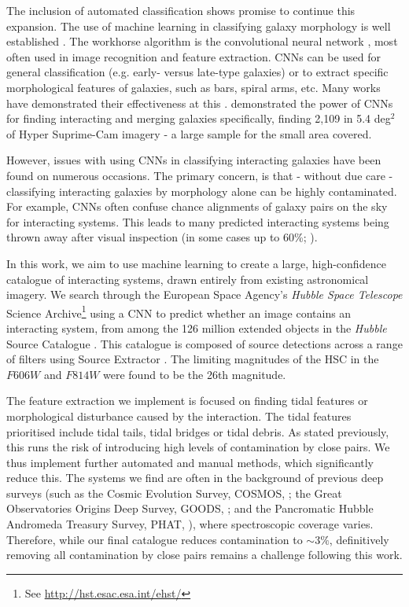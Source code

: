The inclusion of automated classification shows promise to continue this expansion. The use of machine learning in classifying galaxy morphology is well established \citep{1996VA.....40..401A, 2017NatSR...7.4463A, 2020A&C....3000334B, 2020ApJ...895..112G, 2021MNRAS.503.4446C}. The workhorse algorithm is the convolutional neural network \citep[CNN; for an introduction, see][]{2015arXiv151108458O}, most often used in image recognition and feature extraction. CNNs can be used for general classification (e.g. early- versus late-type galaxies) or to extract specific morphological features of galaxies, such as bars, spiral arms, etc. Many works have demonstrated their effectiveness at this \citep[e.g.][]{2018MNRAS.479..415A, 2019ApJS..243...17J, 2021MNRAS.504..372B, 2021arXiv211101154B, 2022MNRAS.509.3966W}. \citet{2022A&A...661A..52P} demonstrated the power of CNNs for finding interacting and merging galaxies specifically, finding 2,109 in 5.4 deg$^2$ of Hyper Suprime-Cam imagery - a large sample for the small area covered.

However, issues with using CNNs in classifying interacting galaxies have been found on numerous occasions. The primary concern, is that - without due care - classifying interacting galaxies by morphology alone can be highly contaminated. For example, CNNs often confuse chance alignments of galaxy pairs on the sky for interacting systems. This leads to many predicted interacting systems being thrown away after visual inspection (in some cases up to 60\%; \citet{2019MNRAS.490.5390B, 2022A&A...661A..52P}). 

In this work, we aim to use machine learning to create a large, high-confidence catalogue of interacting systems, drawn entirely from existing astronomical imagery. We search through the European Space Agency's \emph{Hubble Space Telescope} Science Archive\footnote{See \url{http://hst.esac.esa.int/ehst/}} using a CNN to predict whether an image contains an interacting system, from among the 126 million extended objects in the \emph{Hubble} Source Catalogue \citep[HSC;][]{2016AJ....151..134W}. This catalogue is composed of source detections across a range of filters using Source Extractor \citep{1996A&AS..117..393B}. The limiting magnitudes of the HSC in the $F606W$ and $F814W$ were found to be the 26th magnitude.

The feature extraction we implement is focused on finding tidal features or morphological disturbance caused by the interaction. The tidal features prioritised include tidal tails, tidal bridges or tidal debris. As stated previously, this runs the risk of introducing high levels of contamination by close pairs. We thus implement further automated and manual methods, which significantly reduce this. The systems we find are often in the background of previous deep surveys (such as the Cosmic Evolution Survey, COSMOS, \citealt{2007ApJS..172....1S}; the Great Observatories Origins Deep Survey, GOODS, \citealt{2004ApJ...600L..93G}; and the Pancromatic Hubble Andromeda Treasury Survey, PHAT, \citealt{2012ApJS..200...18D}), where spectroscopic coverage varies. Therefore, while our final catalogue reduces contamination to $\sim 3\%$, definitively removing all contamination by close pairs remains a challenge following this work.

